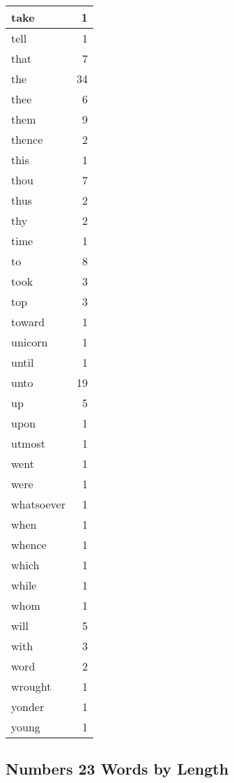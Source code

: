 \begin{center}
\begin{longtable}{l|r}
take & 1\\ \hline 
tell & 1\\ \hline 
that & 7\\ \hline 
the & 34\\ \hline 
thee & 6\\ \hline 
them & 9\\ \hline 
thence & 2\\ \hline 
this & 1\\ \hline 
thou & 7\\ \hline 
thus & 2\\ \hline 
thy & 2\\ \hline 
time & 1\\ \hline 
to & 8\\ \hline 
took & 3\\ \hline 
top & 3\\ \hline 
toward & 1\\ \hline 
unicorn & 1\\ \hline 
until & 1\\ \hline 
unto & 19\\ \hline 
up & 5\\ \hline 
upon & 1\\ \hline 
utmost & 1\\ \hline 
went & 1\\ \hline 
were & 1\\ \hline 
whatsoever & 1\\ \hline 
when & 1\\ \hline 
whence & 1\\ \hline 
which & 1\\ \hline 
while & 1\\ \hline 
whom & 1\\ \hline 
will & 5\\ \hline 
with & 3\\ \hline 
word & 2\\ \hline 
wrought & 1\\ \hline 
yonder & 1\\ \hline 
young & 1\\ \hline 
\end{longtable}
\end{center}





\subsection{Numbers 23 Words by Length}



